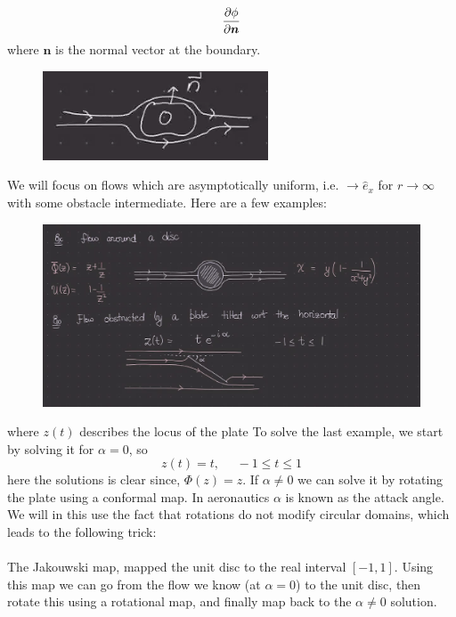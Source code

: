 \documentclass[a4paper,12pt]{article}
\begin{document}
\begin{equation}
\pdv{\phi}{\bm n}
\end{equation} 
where $\bm n$ is the normal vector at the boundary.
\begin{figure}[H]
	\centering
	\includegraphics[width=0.6\linewidth]{9}
	\caption{}
	\label{fig:4}
\end{figure}
We will focus on flows which are asymptotically uniform, i.e. $\bm\to\hat e_x$ for $r\to \infty$ with some obstacle intermediate. Here are a few examples:
\begin{figure}[H]
	\centering
	\includegraphics[width=0.9\linewidth]{10}
	\caption{}
	\label{fig:4}
\end{figure}
where $z(t)$ describes the locus of the plate
To solve the last example, we start by solving it for $\alpha=0$, so
\begin{equation}
z(t)=t,~~~~~~-1\leq t \leq 1
\end{equation}
here the solutions is clear since,
$\Phi(z)=z$. If $\alpha\neq 0$ we can solve it by rotating the plate using a conformal map. In aeronautics $\alpha$ is known as the attack angle. We will in this use the fact that rotations do not modify circular domains, which leads to the following trick:\\\\
The  Jakouwski map, mapped the unit disc to the real interval $[-1,1]$. Using this map we can go from the flow we know (at $\alpha=0$) to the unit disc, then rotate this using a rotational map, and finally map back to the $\alpha\neq 0$ solution.\\\\
\end{document}
